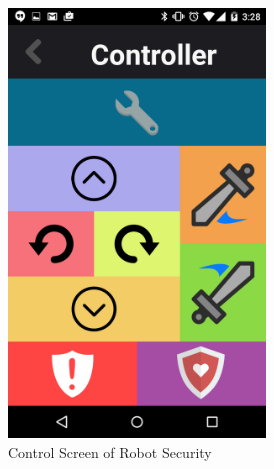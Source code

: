 \documentclass[12pt]{article}
\begin{document}
\begin{figure}[!htbp]
    \centering
    \begin{subfigure}[b]{0.45\textwidth}
    \centering
    \includegraphics[width=0.75\textwidth]{controller.png}
    \caption{Control Screen of Robot Security}
    \label{control}
    \end{subfigure}
    \begin{subfigure}[b]{0.45\textwidth}
    \centering

\end{subfigure}
\end{figure}
\end{document}
